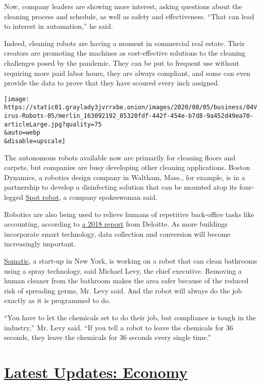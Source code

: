 Now, company leaders are showing more interest, asking questions about
the cleaning process and schedule, as well as safety and effectiveness.
``That can lead to interest in automation,'' he said.

Indeed, cleaning robots are having a moment in commercial real estate.
Their creators are promoting the machines as cost-effective solutions to
the cleaning challenges posed by the pandemic. They can be put to
frequent use without requiring more paid labor hours, they are always
compliant, and some can even provide the data to prove that they have
scoured every inch assigned.

\texttt{[image: https://static01.graylady3jvrrxbe.onion/images/2020/08/05/business/04Virus-Robots-05/merlin\_163092192\_85320fdf-442f-454e-b7d8-9a452d49ea70-articleLarge.jpg?quality=75\\\&auto=webp\\\&disable=upscale]}

The autonomous robots available now are primarily for cleaning floors
and carpets, but companies are busy developing other cleaning
applications. Boston Dynamics, a robotics design company in Waltham,
Mass., for example, is in a partnership to develop a disinfecting
solution that can be mounted atop its four-legged
\href{https://www.bostondynamics.com/spot}{Spot robot}, a company
spokeswoman said.

Robotics are also being used to relieve humans of repetitive back-office
tasks like accounting, according to
\href{https://www2.deloitte.com/global/en/pages/real-estate/articles/robotics-real-estate-services.html}{a
2018 report} from Deloitte. As more buildings incorporate smart
technology, data collection and conversion will become increasingly
important.

\href{http://getsomatic.com/}{Somatic}, a start-up in New York, is
working on a robot that can clean bathrooms using a spray technology,
said Michael Levy, the chief executive. Removing a human cleaner from
the bathroom makes the area safer because of the reduced risk of
spreading germs, Mr. Levy said. And the robot will always do the job
exactly as it is programmed to do.

``You have to let the chemicals set to do their job, but compliance is
tough in the industry,'' Mr. Levy said. ``If you tell a robot to leave
the chemicals for 36 seconds, they leave the chemicals for 36 seconds
every single time.''

\hypertarget{latest-updates-economy}{%
\section{\texorpdfstring{\href{https://www.nytimes3xbfgragh.onion/live/2020/08/04/business/stock-market-today-coronavirus?action=click\&pgtype=Article\&state=default\&region=MAIN_CONTENT_1\&context=storylines_live_updates}{Latest
Updates:
Economy}}{Latest Updates: Economy}}\label{latest-updates-economy}}

